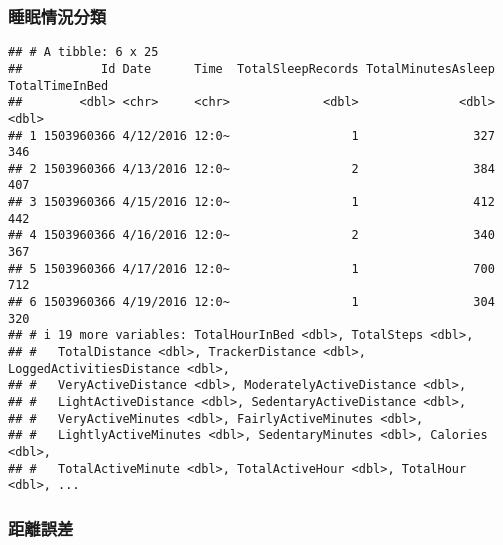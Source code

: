 \documentclass[
]{article}
\newenvironment{Shaded}{\begin{snugshade}}{\end{snugshade}}
\newcommand{\ConstantTok}[1]{\textcolor[rgb]{0.00,0.00,0.00}{#1}}
\newcommand{\DecValTok}[1]{\textcolor[rgb]{0.00,0.00,0.81}{#1}}
\newcommand{\FunctionTok}[1]{\textcolor[rgb]{0.00,0.00,0.00}{#1}}
\newcommand{\NormalTok}[1]{#1}
\newcommand{\OtherTok}[1]{\textcolor[rgb]{0.56,0.35,0.01}{#1}}
\newcommand{\SpecialCharTok}[1]{\textcolor[rgb]{0.00,0.00,0.00}{#1}}
\newcommand{\StringTok}[1]{\textcolor[rgb]{0.31,0.60,0.02}{#1}}
\begin{document}
\hypertarget{ux7761ux7720ux60c5ux6cc1ux5206ux985e}{%
\subsubsection{睡眠情況分類}\label{ux7761ux7720ux60c5ux6cc1ux5206ux985e}}

\begin{Shaded}
\end{Shaded}

\begin{verbatim}
## # A tibble: 6 x 25
##           Id Date      Time  TotalSleepRecords TotalMinutesAsleep TotalTimeInBed
##        <dbl> <chr>     <chr>             <dbl>              <dbl>          <dbl>
## 1 1503960366 4/12/2016 12:0~                 1                327            346
## 2 1503960366 4/13/2016 12:0~                 2                384            407
## 3 1503960366 4/15/2016 12:0~                 1                412            442
## 4 1503960366 4/16/2016 12:0~                 2                340            367
## 5 1503960366 4/17/2016 12:0~                 1                700            712
## 6 1503960366 4/19/2016 12:0~                 1                304            320
## # i 19 more variables: TotalHourInBed <dbl>, TotalSteps <dbl>,
## #   TotalDistance <dbl>, TrackerDistance <dbl>, LoggedActivitiesDistance <dbl>,
## #   VeryActiveDistance <dbl>, ModeratelyActiveDistance <dbl>,
## #   LightActiveDistance <dbl>, SedentaryActiveDistance <dbl>,
## #   VeryActiveMinutes <dbl>, FairlyActiveMinutes <dbl>,
## #   LightlyActiveMinutes <dbl>, SedentaryMinutes <dbl>, Calories <dbl>,
## #   TotalActiveMinute <dbl>, TotalActiveHour <dbl>, TotalHour <dbl>, ...
\end{verbatim}

\hypertarget{ux8dddux96e2ux8aa4ux5dee}{%
\subsubsection{距離誤差}\label{ux8dddux96e2ux8aa4ux5dee}}
\end{document}
